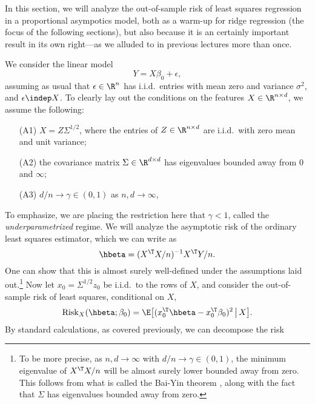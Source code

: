 \documentclass{article}
\begin{document}
\def\Risk{\mathrm{Risk}}
\def\Bias{\mathrm{Bias}}

In this section, we will analyze the out-of-sample risk of least squares
regression in a proportional asympotics model, both as a warm-up for ridge
regression (the focus of the following sections), but also because it is an
certainly important result in its own right---as we alluded to in previous
lectures more than once. 

We consider the linear model
\begin{equation}
\label{eq:model}
Y = X\beta_0 + \epsilon,
\end{equation}
assuming as usual that $\epsilon \in \R^n$ has i.i.d.\ entries with mean zero
and variance $\sigma^2$, and $\epsilon \indep X$. To clearly lay out the
conditions on the features $X \in \R^{n \times d}$, we assume the following: 
\begin{itemize}
\item[(A1)] $X = Z \Sigma^{1/2}$, where the entries of $Z \in \R^{n \times d}$
  are i.i.d.\ with zero mean and unit variance;
\item[(A2)] the covariance matrix $\Sigma \in \R^{d \times d}$ has eigenvalues
  bounded away from $0$ and $\infty$;  
\item[(A3)] $d/n \to \gamma \in (0,1)$ as $n,d \to \infty$,
\end{itemize}
To emphasize, we are placing the restriction here that $\gamma < 1$, called the
\emph{underparametrized} regime. We will analyze the asymptotic risk of the
ordinary least squares estimator, which we can write as 
\begin{equation}
\label{eq:ls_rescaled}
\hbeta = (X^\T X/n)^{-1} X^\T Y/n.
\end{equation}
One can show that this is almost surely well-defined under the assumptions laid
out.\footnote{To be more precise, as $n,d \to \infty$ with $d/n \to \gamma \in
  (0,1)$, the minimum eigenvalue of $X^\T X/n$ will be almost surely lower
  bounded away from zero. This follows from what is called the Bai-Yin theorem 
  \citep{bai1993limit}, along with the fact that $\Sigma$ has eigenvalues
  bounded away from zero.}  
Now let $x_0 = \Sigma^{1/2} z_0$ be i.i.d.\ to the rows of $X$, and consider the
out-of-sample risk of least squares, conditional on $X$,
\begin{equation}
\label{eq:risk}
\Risk_X(\hbeta; \beta_0) = \E \big[ ( x_0^\T \hbeta - x_0^\T \beta_0 )^2
\,\big|\, X \big].
\end{equation}
By standard calculations, as covered previously, we can decompose the risk
\end{document}
